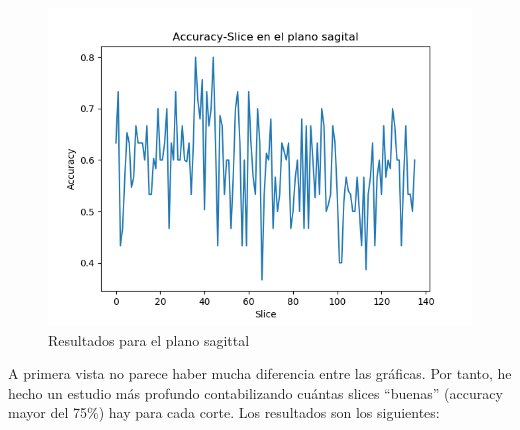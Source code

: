 \begin{figure}[H] %
	\centering
	\includegraphics[scale=0.75]{exp1-sag.png}  %
	\caption{Resultados para el plano sagittal} 
	\label{fig:exp1-sag}
\end{figure}

A primera vista no parece haber mucha diferencia entre las gráficas. Por tanto, he hecho un estudio más profundo contabilizando cuántas slices ``buenas'' (accuracy mayor del 75\%) hay para cada corte. Los resultados son los siguientes:

